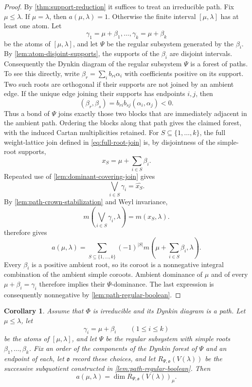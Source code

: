 \documentclass[11pt]{article}
\newtheorem{corollary}[corollary]{Corollary}
\theoremstyle{definition}
\theoremstyle{remark}
\newcommand{\Raiz}{\Phi}
\begin{document}
\begin{proof}
By \cref{thm:support-reduction} it suffices to treat an irreducible path.  Fix
$\mu\le\lambda$.  If $\mu=\lambda$, then $a(\mu,\lambda)=1$.
Otherwise the finite interval $[\mu,\lambda]$ has at least one atom.  Let
\[
       \gamma_1=\mu+\beta_1,\ldots,\gamma_k=\mu+\beta_k
\]
be the atoms of $[\mu,\lambda]$, and let $\Psi$ be the regular subsystem
generated by the $\beta_i$.  By \cref{lem:atom-disjoint-supports}, the
supports of the $\beta_i$ are disjoint intervals.  Consequently the Dynkin
diagram of the regular subsystem $\Psi$ is a forest of paths.  To see this
directly, write $\beta_r=\sum_i b_{ri}\alpha_i$ with coefficients positive on
its support.  Two such roots are orthogonal if their supports are not joined
by an ambient edge.  If the unique edge joining their supports has endpoints
$i,j$, then
\[
             (\beta_r,\beta_s)=b_{ri}b_{sj}(\alpha_i,\alpha_j)<0.
\]
Thus a bond of $\Psi$ joins exactly those two blocks that are immediately
adjacent in the ambient path.  Ordering the blocks along that path gives
the claimed forest, with the induced Cartan multiplicities retained.  For
$S\subseteq\{1,\ldots,k\}$, the full weight-lattice join defined in
\eqref{eq:full-root-join} is, by disjointness of the simple-root supports,
\[
       x_S=\mu+\sum_{i\in S}\beta_i.
\]
Repeated use of \cref{lem:dominant-covering-join} gives
\[
       \bigvee_{i\in S}\gamma_i=\widehat{x_S}.
\]
By \cref{lem:path-crown-stabilization} and Weyl invariance,
\[
       m\!\left(\bigvee_{i\in S}\gamma_i,\lambda\right)
          =m(x_S,\lambda).
\]
 therefore gives
\[
 a(\mu,\lambda)
   =\sum_{S\subseteq\{1,\ldots,k\}}(-1)^{|S|}
       m\!\left(\mu+\sum_{i\in S}\beta_i,\lambda\right).
\]
Every $\beta_i$ is a positive ambient root, so its coroot is a nonnegative
integral combination of the ambient simple coroots.  Ambient dominance of
$\mu$ and of every $\mu+\beta_i=\gamma_i$ therefore implies their
$\Psi$-dominance.  The last expression is consequently nonnegative by
\cref{lem:path-regular-boolean}.
\end{proof}

\begin{corollary}
\label{cor:path-primitive-model}
Assume that $\Raiz$ is irreducible and its Dynkin diagram is a path.  Let
$\mu\le\lambda$, let
\[
       \gamma_i=\mu+\beta_i\qquad(1\le i\le k)
\]
be the atoms of $[\mu,\lambda]$, and let $\Psi$ be the regular subsystem with
simple roots $\beta_1,\ldots,\beta_k$.  Fix an order of the components of the
Dynkin forest of $\Psi$ and an endpoint of each, let $\mathfrak o$ record
these choices, and let
$R_{\Psi,\mathfrak o}(V(\lambda))$ be the successive subquotient constructed
in \cref{lem:path-regular-boolean}.  Then
\begin{equation}\label{eq:path-primitive-model}
       a(\mu,\lambda)=\dim R_{\Psi,\mathfrak o}(V(\lambda))_\mu.
\end{equation}
\end{corollary}
\end{document}
